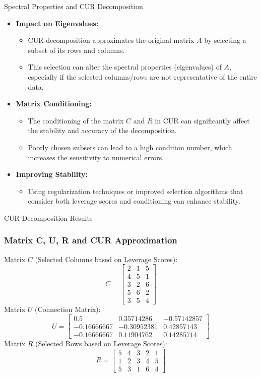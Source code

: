 \documentclass[pdf]{beamer}
\begin{document}
\begin{frame}{Spectral Properties and CUR Decomposition}
    \begin{itemize}
        \item \textbf{Impact on Eigenvalues:}
            \begin{itemize}
                \item CUR decomposition approximates the original matrix \( A \) by selecting a subset of its rows and columns.
                \item This selection can alter the spectral properties (eigenvalues) of \( A \), especially if the selected columns/rows are not representative of the entire data.
            \end{itemize}
        \item \textbf{Matrix Conditioning:}
            \begin{itemize}
                \item The conditioning of the matrix \( C \) and \( R \) in CUR can significantly affect the stability and accuracy of the decomposition.
                \item Poorly chosen subsets can lead to a high condition number, which increases the sensitivity to numerical errors.
            \end{itemize}
        \item \textbf{Improving Stability:}
            \begin{itemize}
                \item Using regularization techniques or improved selection algorithms that consider both leverage scores and conditioning can enhance stability.
            \end{itemize}
    \end{itemize}
\end{frame}

\begin{frame}{CUR Decomposition Results}
    \frametitle{Matrix C, U, R and CUR Approximation}
    Matrix \( C \) (Selected Columns based on Leverage Scores):
    \[
    C = \begin{bmatrix} 2 & 1 & 5 \\ 4 & 5 & 1 \\ 3 & 2 & 6 \\ 5 & 6 & 2 \\ 3 & 5 & 4 \end{bmatrix}
    \]
    Matrix \( U \) (Connection Matrix):
    \[
    U = \begin{bmatrix} 0.5 & 0.35714286 & -0.57142857 \\ -0.16666667 & -0.30952381 & 0.42857143 \\ -0.16666667 & 0.11904762 & 0.14285714 \end{bmatrix}
    \]
    Matrix \( R \) (Selected Rows based on Leverage Scores):
    \[
    R = \begin{bmatrix} 5 & 4 & 3 & 2 & 1 \\ 1 & 2 & 3 & 4 & 5 \\ 5 & 3 & 1 & 6 & 4 \end{bmatrix}
    \]
\end{frame}
\end{document}
